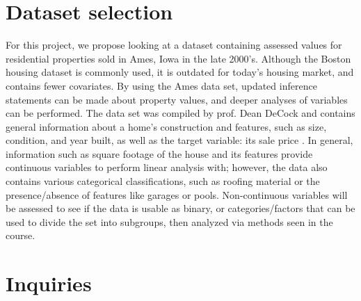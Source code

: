 \documentclass{article}
\begin{document}
\section{Dataset selection}

For this project, we propose looking at a dataset containing assessed values for residential properties sold in Ames, Iowa in the late 2000's. Although the Boston housing dataset is commonly used, it is outdated for today's housing market, and contains fewer covariates. By using the Ames data set, updated inference statements can be made about property values, and deeper analyses of variables can be performed. The data set was compiled by prof. Dean DeCock and contains general information about a home's construction and features, such as size, condition, and year built, as well as the target variable: its sale price \parencite{DDC}. In general, information such as square footage of the house and its features provide continuous variables to perform linear analysis with; however, the data also contains various categorical classifications, such as roofing material or the presence/absence of features like garages or pools. Non-continuous variables will be assessed to see if the data is usable as binary, or categories/factors that can be used to divide the set into subgroups, then analyzed via methods seen in the course.

\section{Inquiries}

\end{document}
